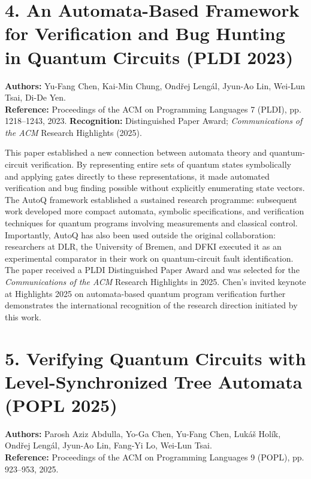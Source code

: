\documentclass[10pt,a4paper]{article}
\begin{document}
\newpage
\section{4. An Automata-Based Framework for Verification and Bug Hunting in Quantum Circuits (PLDI 2023)}
\textbf{Authors:} Yu-Fang Chen, Kai-Min Chung, Ondřej Lengál, Jyun-Ao Lin, Wei-Lun Tsai, Di-De Yen.\\
\textbf{Reference:} Proceedings of the ACM on Programming Languages 7 (PLDI), pp. 1218--1243, 2023. \textbf{Recognition:} Distinguished Paper Award; \emph{Communications of the ACM} Research Highlights (2025).

This paper established a new connection between automata theory and quantum-circuit verification. By representing entire sets of quantum states symbolically and applying gates directly to these representations, it made automated verification and bug finding possible without explicitly enumerating state vectors. The AutoQ framework established a sustained research programme: subsequent work developed more compact automata, symbolic specifications, and verification techniques for quantum programs involving measurements and classical control. Importantly, AutoQ has also been used outside the original collaboration: researchers at DLR, the University of Bremen, and DFKI executed it as an experimental comparator in their work on quantum-circuit fault identification. The paper received a PLDI Distinguished Paper Award and was selected for the \emph{Communications of the ACM} Research Highlights in 2025. Chen's invited keynote at Highlights 2025 on automata-based quantum program verification further demonstrates the international recognition of the research direction initiated by this work.

\section{5. Verifying Quantum Circuits with Level-Synchronized Tree Automata (POPL 2025)}
\textbf{Authors:} Parosh Aziz Abdulla, Yo-Ga Chen, Yu-Fang Chen, Lukáš Holík, Ondřej Lengál, Jyun-Ao Lin, Fang-Yi Lo, Wei-Lun Tsai.\\
\textbf{Reference:} Proceedings of the ACM on Programming Languages 9 (POPL), pp. 923--953, 2025.
\end{document}
